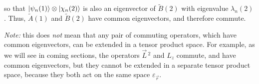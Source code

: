 so that $\ket{\psi_n(1)}\otimes\ket{\chi_n(2)}$ is also an eigenvector of $\tilde B(2)$ with eigenvalue $\lambda_n(2)$. Thus, $\tilde A(1)$ and $\tilde B(2)$ have common eigenvectors, and therefore commute.

\textit{Note:} this does \textit{not} mean that any pair of commuting operators, which have common eigenvectors, can be extended in a tensor product space. For example, as we will see in coming sections, the operators $\vec{L}\,^2$ and $L_z$ commute, and have common eigenvectors, but they cannot be extended in a separate tensor product space, because they both act on the same space $\varepsilon_{\vec{r}}$.




